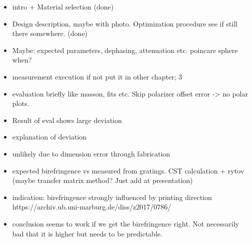 \begin{itemize}
    \item intro + Material selection (done)
    \item Design description, maybe with photo. Optimization procedure see if still there somewhere. (done)
    \item Maybe: expected parameters, dephasing, attenuation etc. poincare sphere when?
    \item measurement execution if not put it in other chapter; 3
    \item evaluation briefly like masson, fits etc. Skip polarizer offset error -> no polar plots.
    \item Result of eval shows large deviation
    \item explanation of deviation
    \item unlikely due to dimension error through fabrication
    \item expected birefringence vs measured from gratings. CST calculation + rytov (maybe transfer matrix method? Just add at presentation)
    \item indication: birefringence strongly influenced by printing direction https://archiv.ub.uni-marburg.de/diss/z2017/0786/ 
    \item conclusion seems to work if we get the birefringence right. Not necessarily bad that it is higher but needs to be predictable. 
\end{itemize}




